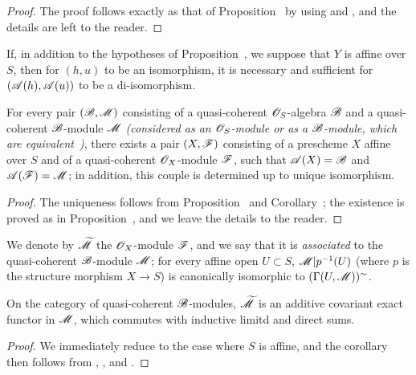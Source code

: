 \begin{proof}
\label{proof-2.1.4.1}
The proof follows exactly as that of Proposition~ by using  and , and the details are left to the reader.
\end{proof}

\begin{corollary}[1.4.2]
\label{2.1.4.2}
If, in addition to the hypotheses of Proposition~, we suppose that $Y$ is affine over $S$, then for $(h,u)$ to be an isomorphism, it is necessary and sufficient for $(\mathscr{A}(h),\mathscr{A}(u))$ to be a di-isomorphism.
\end{corollary}

\begin{proposition}[1.4.3]
\label{2.1.4.3}
For every pair $(\mathscr{B},\mathscr{M})$ consisting of a quasi-coherent $\mathscr{O}_S$-algebra $\mathscr{B}$ and a quasi-coherent $\mathscr{B}$-module $\mathscr{M}$ \emph{(considered as an $\mathscr{O}_S$-module or as a $\mathscr{B}$-module, which are equivalent~)}, there exists a pair $(X,\mathscr{F})$ consisting of a prescheme $X$ affine over $S$ and of a quasi-coherent $\mathscr{O}_X$-module $\mathscr{F}$, such that $\mathscr{A}(X)=\mathscr{B}$ and $\mathscr{A}(\mathscr{F})=\mathscr{M}$; in addition, this couple is determined up to unique isomorphism.
\end{proposition}

\begin{proof}
\label{proof-2.1.4.3}
The uniqueness follows from Proposition~ and Corollary~; the existence is proved as in Proposition~, and we leave the details to the reader.
\end{proof}

We denote by $\widetilde{\mathscr{M}}$ the $\mathscr{O}_X$-module $\mathscr{F}$, and we say that it is \emph{associated} to the quasi-coherent $\mathscr{B}$-module $\mathscr{M}$; for every affine open $U\subset S$, $\mathscr{M}|p^{-1}(U)$ (where $p$ is the structure morphism $X\to S$) is canonically isomorphic to $(\Gamma(U,\mathscr{M}))^\sim$.

\begin{corollary}[1.4.4]
\label{2.1.4.4}
On the category of quasi-coherent $\mathscr{B}$-modules, $\widetilde{\mathscr{M}}$ is an additive covariant exact functor in $\mathscr{M}$, which commutes with inductive limitd and direct sums.
\end{corollary}

\begin{proof}
\label{proof-2.1.4.4}
We immediately reduce to the case where $S$ is affine, and the corollary then follows from , , and .
\end{proof}

